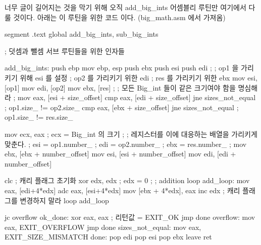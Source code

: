너무 글이 길어지는 것을 막기 위해 오직 {\code add\_big\_ints} 어셈블리 루틴만
여기에서 다룰 것이다. 아래는 이 루틴을 위한 코드 이다. ({\code big\_math.asm} 에서 가져옴)

\begin{AsmCodeListing}[label=big\_math.asm]
segment .text
        global  add_big_ints, sub_big_ints


; 덧셈과 뺄셈 서브 루틴들을 위한 인자들

add_big_ints:
        push    ebp
        mov     ebp, esp
        push    ebx
        push    esi
        push    edi
        ;
        ; op1 을 가리키기 위해 esi 를 설정 
        ; op2 를 가리키기 위한 edi 
        ; res 를 가리키기 위한 ebx
        mov     esi, [op1]
        mov     edi, [op2]
        mov     ebx, [res]
        ;
        ; 모든 Big_int 들이 같은 크기여야 함을 명심해라 
        ;
        mov     eax, [esi + size_offset]
        cmp     eax, [edi + size_offset]
        jne     sizes_not_equal                 ; op1.size_ != op2.size_
        cmp     eax, [ebx + size_offset]
        jne     sizes_not_equal                 ; op1.size_ != res.size_

        mov     ecx, eax                        ; ecx = Big_int 의 크기
        ;
        ; 레지스터를 이에 대응하는 배열을 가리키게 맞춘다. 
        ;      esi = op1.number_
        ;      edi = op2.number_
        ;      ebx = res.number_
        ;
        mov     ebx, [ebx + number_offset]
        mov     esi, [esi + number_offset]
        mov     edi, [edi + number_offset]
        
        clc                                     ; 캐리 플래그 초기화
        xor     edx, edx                        ; edx = 0
        ;
        ; addition loop
add_loop:
        mov     eax, [edi+4*edx]
        adc     eax, [esi+4*edx]
        mov     [ebx + 4*edx], eax
        inc     edx                             ; 캐리 플래그를 변경하지 말라 
        loop    add_loop

        jc      overflow
ok_done:
        xor     eax, eax                        ; 리턴값 = EXIT_OK
        jmp     done
overflow:
        mov     eax, EXIT_OVERFLOW
        jmp     done
sizes_not_equal:
        mov     eax, EXIT_SIZE_MISMATCH
done:
        pop     edi
        pop     esi
        pop     ebx
        leave
        ret
\end{AsmCodeListing}

